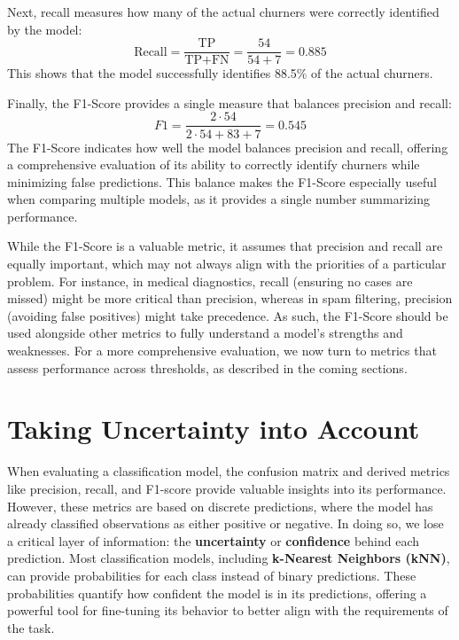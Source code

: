 \documentclass[
]{book}
\theoremstyle{definition}
\theoremstyle{definition}
\theoremstyle{definition}
\theoremstyle{definition}
\theoremstyle{remark}
\begin{document}
Next, recall measures how many of the actual churners were correctly identified by the model:
\[
\text{Recall} = \frac{\text{TP}}{\text{TP} + \text{FN}} = \frac{54}{54 + 7} = 0.885
\]
This shows that the model successfully identifies 88.5\% of the actual churners.

Finally, the F1-Score provides a single measure that balances precision and recall:
\[
F1 = \frac{2 \cdot 54}{2 \cdot 54 + 83 + 7} = 0.545
\]
The F1-Score indicates how well the model balances precision and recall, offering a comprehensive evaluation of its ability to correctly identify churners while minimizing false predictions. This balance makes the F1-Score especially useful when comparing multiple models, as it provides a single number summarizing performance.

While the F1-Score is a valuable metric, it assumes that precision and recall are equally important, which may not always align with the priorities of a particular problem. For instance, in medical diagnostics, recall (ensuring no cases are missed) might be more critical than precision, whereas in spam filtering, precision (avoiding false positives) might take precedence. As such, the F1-Score should be used alongside other metrics to fully understand a model's strengths and weaknesses. For a more comprehensive evaluation, we now turn to metrics that assess performance across thresholds, as described in the coming sections.

\section{Taking Uncertainty into Account}\label{taking-uncertainty-into-account}

When evaluating a classification model, the confusion matrix and derived metrics like precision, recall, and F1-score provide valuable insights into its performance. However, these metrics are based on discrete predictions, where the model has already classified observations as either positive or negative. In doing so, we lose a critical layer of information: the \textbf{uncertainty} or \textbf{confidence} behind each prediction. Most classification models, including \textbf{k-Nearest Neighbors (kNN)}, can provide probabilities for each class instead of binary predictions. These probabilities quantify how confident the model is in its predictions, offering a powerful tool for fine-tuning its behavior to better align with the requirements of the task.
\end{document}
